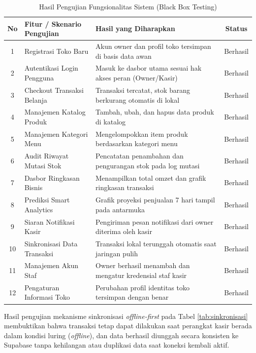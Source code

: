 \documentclass[10pt,a4paper]{article}
\begin{document}
\begin{table}[H]
  \centering
  \caption{Hasil Pengujian Fungsionalitas Sistem (Black Box Testing)}
  \label{tab:blackbox}
  \fontsize{9pt}{11pt}\selectfont
  \begin{tabularx}{\textwidth}{clXc}
    \toprule
    \textbf{No} & \textbf{Fitur / Skenario Pengujian} & \textbf{Hasil yang Diharapkan} & \textbf{Status} \\
    \midrule
    1 & Registrasi Toko Baru & Akun owner dan profil toko tersimpan di basis data awan & Berhasil \\
    2 & Autentikasi Login Pengguna & Masuk ke dasbor utama sesuai hak akses peran (Owner/Kasir) & Berhasil \\
    3 & Checkout Transaksi Belanja & Transaksi tercatat, stok barang berkurang otomatis di lokal & Berhasil \\
    4 & Manajemen Katalog Produk & Tambah, ubah, dan hapus data produk di katalog & Berhasil \\
    5 & Manajemen Kategori Menu & Mengelompokkan item produk berdasarkan kategori menu & Berhasil \\
    6 & Audit Riwayat Mutasi Stok & Pencatatan penambahan dan pengurangan stok pada log mutasi & Berhasil \\
    7 & Dasbor Ringkasan Bisnis & Menampilkan total omzet dan grafik ringkasan transaksi & Berhasil \\
    8 & Prediksi Smart Analytics & Grafik proyeksi penjualan 7 hari tampil pada antarmuka & Berhasil \\
    9 & Siaran Notifikasi Kasir & Pengiriman pesan notifikasi dari owner diterima oleh kasir & Berhasil \\
    10 & Sinkronisasi Data Transaksi & Transaksi lokal terunggah otomatis saat jaringan pulih & Berhasil \\
    11 & Manajemen Akun Staf & Owner berhasil menambah dan mengatur kredensial staf kasir & Berhasil \\
    12 & Pengaturan Informasi Toko & Perubahan profil identitas toko tersimpan dengan benar & Berhasil \\
    \bottomrule
  \end{tabularx}
\end{table}

Hasil pengujian mekanisme sinkronisasi \textit{offline-first} pada Tabel \ref{tab:sinkronisasi} membuktikan bahwa transaksi tetap dapat dilakukan saat perangkat kasir berada dalam kondisi luring (\textit{offline}), dan data berhasil diunggah secara konsisten ke Supabase tanpa kehilangan atau duplikasi data saat koneksi kembali aktif.
\end{document}
